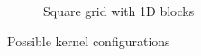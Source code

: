 \documentclass[a4paper]{article}
\begin{document}
\begin{figure}[!ht]
\begin{subfigure}{0.5\textwidth}
\caption{Square grid with 1D blocks}
\label{fig:s1}
\end{subfigure}
\caption{Possible kernel configurations}
 \label{fig:speed}
\end{figure}
\FloatBarrier


\printbibliography 
\end{document}
